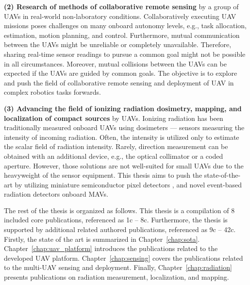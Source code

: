 \documentclass[a4paper,11pt,twoside,openright]{book}
\begin{document}
\textbf{(2) Research of methods of collaborative remote sensing} by a group of \aclp{UAV} in real-world non-laboratory conditions.
Collaboratively executing UAV missions poses challenges on many onboard autonomy levels, e.g., task allocation, estimation, motion planning, and control.
Furthermore, mutual communication between the \acp{UAV} might be unreliable or completely unavailable.
Therefore, sharing real-time sensor readings to pursue a common goal might not be possible in all circumstances.
Moreover, mutual collisions between the \acp{UAV} can be expected if the \acp{UAV} are guided by common goals.
The objective is to explore and push the field of collaborative remote sensing and deployment of \ac{UAV} in complex robotics tasks forwards.

\textbf{(3) Advancing the field of ionizing radiation dosimetry, mapping, and localization of compact sources} by \aclp{UAV}.
Ionizing radiation has been traditionally measured onboard \acp{UAV} using dosimeters \cite{nagatani2013emergency, sanada2015aerial, towler2012radiation, jiang2016prototype} --- sensors measuring the intensity of incoming radiation.
Often, the intensity is utilized only to estimate the scalar field of radiation intensity.
Rarely, direction measurement can be obtained with an additional device, e.g., the optical collimator or a coded aperture.
However, those solutions are not well-suited for small \acp{UAV} due to the heavyweight of the sensor equipment.
This thesis aims to push the state-of-the-art by utilizing miniature semiconductor pixel detectors \cite{llopart2007timepix}, and novel event-based radiation detectors \cite{poikela2014timepix3} onboard \acp{MAV}.

The rest of the thesis is organized as follows.
This thesis is a compilation of 8 included core publications, referenced as 1c -- 8c.
Furthermore, the thesis is supported by additional related authored publications, referenced as 9c -- 42c.
Firstly, the state of the art is summarized in Chapter~\ref{chap:sota}.
Chapter~\ref{chap:uav_platform} introduces the publications related to the developed \ac{UAV} platform.
Chapter~\ref{chap:sensing} covers the publications related to the multi-\ac{UAV} sensing and deployment.
Finally, Chapter~\ref{chap:radiation} presents publications on radiation measurement, localization, and mapping.



\end{document}
